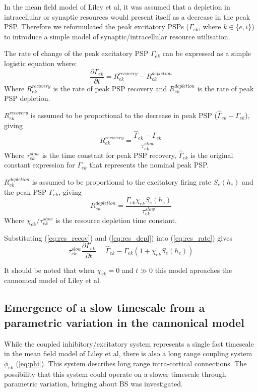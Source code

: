 \documentclass[a4paper,12pt]{article}
\begin{document}
In the mean field model of Liley et al, it was assumed that a depletion in intracellular or synaptic resources would present itself as a decrease in the peak PSP. Therefore we reformulated the peak excitatory PSPs ($\Gamma_{ek}$, where $k \in \{e, i\}$) to
introduce a simple model of synaptic/intracellular resource utilisation.

The rate of change of the peak excitatory PSP $\Gamma_{ek}$ can be expressed as a simple logistic equation where:
\begin{equation}
\label{eq:res_rate}
\frac{\partial{\Gamma_{ek}}}{\partial{t}} = R_{ek}^{recovery} - R_{ek}^{depletion}
\end{equation}
\noindent
Where $R_{ek}^{recovery}$ is the rate of peak PSP recovery and $R_{ek}^{depletion}$ is the rate of peak PSP depletion.

$R_{ek}^{recovery}$ is assumed to be proportional to the decrease in peak PSP ($\hat{\Gamma}_{ek} - {\Gamma}_{ek}$), giving
\begin{equation}
\label{eq:res_recov}
R_{ek}^{recovery}= \frac{\hat{\Gamma}_{ek} - {\Gamma}_{ek}}{\tau_{ek}^{slow}}
\end{equation}
\noindent
Where $\tau_{ek}^{slow}$ is the time constant for peak PSP recovery, $\hat{\Gamma}_{ek}$ is the original constant expression for $\Gamma_{ek}$ that represents the nominal peak PSP.

$R_{ek}^{depletion}$ is assumed to be proportional to the excitatory firing rate $S_e(h_e)$ and the peak PSP $\Gamma_{ek}$, giving
\begin{equation}
\label{eq:res_depl}
R_{ek}^{depletion}= \frac{\Gamma_{ek} \chi_{ek}S_e(h_e)}{\tau_{ek}^{slow}}
\end{equation}
\noindent
Where $\chi_{ek}/\tau_{ek}^{slow}$ is the resource depletion time constant.

Substituting (\ref{eq:res_recov}) and (\ref{eq:res_depl}) into (\ref{eq:res_rate}) gives
\begin{equation} \label{eq:Gamma_ek}
{\tau^{slow}_{ek}} \frac{\partial{\Gamma_{ek}}}{\partial{t}} = \hat{\Gamma}_{ek} - \Gamma_{ek}(1 + \chi_{ek} S_e(h_e))
\end{equation}

It should be noted that when $\chi_{ek}=0$ and $t \gg 0$ this model aproaches the cannonical model of Liley et al.

\subsection{Emergence of a slow timescale from a parametric variation in the cannonical model}
While the coupled inhibitory/excitatory system represents a single fast timescale in the mean field model of Liley et al, there is also a long range coupling system $\phi_{ek}$ (\ref{eq:phi}). This system describes long range intra-cortical connections. The possibility that this system could operate on a slower timescale through parametric variation, bringing about BS was investigated.
\end{document}
